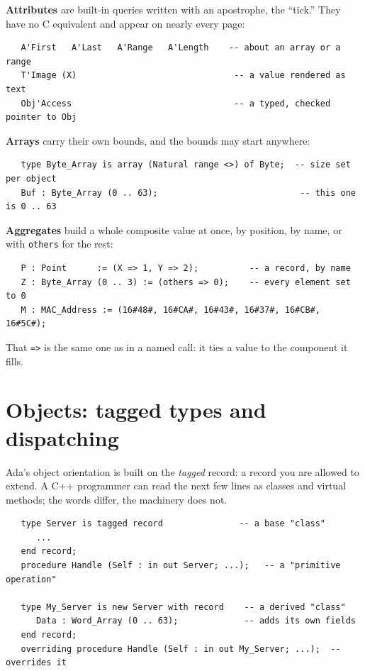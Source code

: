 \textbf{Attributes} are built-in queries written with an apostrophe, the ``tick.''
They have no C equivalent and appear on nearly every page:

\begin{lstlisting}
   A'First   A'Last   A'Range   A'Length    -- about an array or a range
   T'Image (X)                               -- a value rendered as text
   Obj'Access                                -- a typed, checked pointer to Obj
\end{lstlisting}

\textbf{Arrays} carry their own bounds, and the bounds may start anywhere:

\begin{lstlisting}
   type Byte_Array is array (Natural range <>) of Byte;  -- size set per object
   Buf : Byte_Array (0 .. 63);                            -- this one is 0 .. 63
\end{lstlisting}

\textbf{Aggregates} build a whole composite value at once, by position, by name,
or with \texttt{others} for the rest:

\begin{lstlisting}
   P : Point      := (X => 1, Y => 2);          -- a record, by name
   Z : Byte_Array (0 .. 3) := (others => 0);    -- every element set to 0
   M : MAC_Address := (16#48#, 16#CA#, 16#43#, 16#37#, 16#CB#, 16#5C#);
\end{lstlisting}

That \texttt{=>} is the same one as in a named call: it ties a value to the
component it fills.

\section{Objects: tagged types and dispatching}

Ada's object orientation is built on the \emph{tagged} record: a record you are
allowed to extend. A C++ programmer can read the next few lines as classes and
virtual methods; the words differ, the machinery does not.

\begin{lstlisting}
   type Server is tagged record               -- a base "class"
      ...
   end record;
   procedure Handle (Self : in out Server; ...);   -- a "primitive operation"

   type My_Server is new Server with record    -- a derived "class"
      Data : Word_Array (0 .. 63);             -- adds its own fields
   end record;
   overriding procedure Handle (Self : in out My_Server; ...);  -- overrides it
\end{lstlisting}

